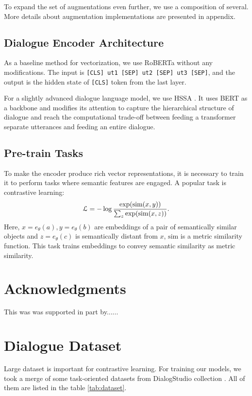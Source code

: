 \documentclass{article}
\begin{document}
To expand the set of augmentations even further, we use a composition of several. More details about augmentation implementations are presented in appendix.

\subsection{Dialogue Encoder Architecture}

As a baseline method for vectorization, we use RoBERTa \cite{liu2019roberta} without any modifications. The input is \texttt{[CLS] ut1 [SEP] ut2 [SEP] ut3 [SEP]}, and the output is the hidden state of \texttt{[CLS]} token from the last layer. 

For a slightly advanced dialogue language model, we use HSSA \cite{zhang-etal-2023-dialog}. It uses BERT \cite{devlin2019bert} as a backbone and modifies its attention to capture the hierarchical structure of dialogue and reach the computational trade-off between feeding a transformer separate utterances and feeding an entire dialogue.

\subsection{Pre-train Tasks}

To make the encoder produce rich vector representations, it is necessary to train it to perform tasks where semantic features are engaged. A popular task is contrastive learning:
$$
\mathcal{L}=-\log{\exp(\text{sim}(x,y))\over\sum_{z}\exp(\text{sim}(x,z))}.
$$
Here, $x=e_\theta(a), y=e_\theta(b)$ are embeddings of a pair of semantically similar objects and $z=e_\theta(c)$ is semantically distant from $x$, $\text{sim}$ is a metric similarity function. This task trains embeddings to convey semantic similarity as metric similarity.

\section*{Acknowledgments}
This was was supported in part by......

  
  

\appendix
\section{Dialogue Dataset}
Large dataset is important for contrastive learning. For training our models, we took a merge of some task-oriented datasets from DialogStudio collection \cite{zhang2023dialogstudio}. All of them are listed in the table \ref{tab:dataset}.
\end{document}
